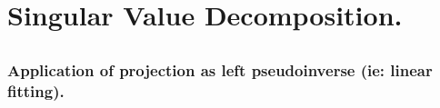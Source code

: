 
%


%
%

\chapter{Singular Value Decomposition.}
\date{ May 15, 2008.  $RCSfile: mpInverseSvdRoughNotes.tex,v $ Last $Revision: 1.10 $ $Date: 2009/06/11 17:00:37 $ }



\section{}


















\subsection{Application of projection as left pseudoinverse (ie: linear fitting). }


%

